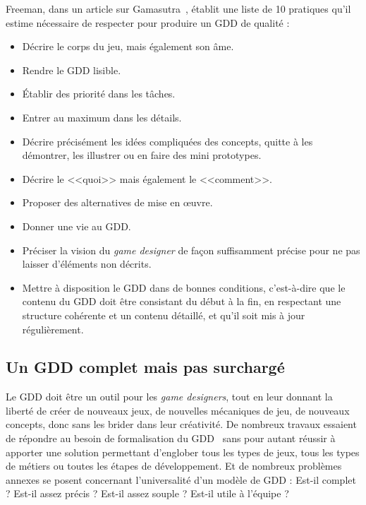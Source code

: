 Freeman, dans un article sur Gamasutra~\cite{gama_greateGDD}, établit une liste de 10 pratiques qu'il estime nécessaire de respecter pour produire un GDD de qualité :
\begin{itemize}
    \item Décrire le corps du jeu, mais également son âme.
    \item Rendre le GDD lisible.
    \item Établir des priorité dans les tâches.
    \item Entrer au maximum dans les détails.
    \item Décrire précisément les idées compliquées des concepts, quitte à les démontrer, les illustrer ou en faire des mini prototypes.
    \item Décrire le <<quoi>> mais également le <<comment>>.
    \item Proposer des alternatives de mise en \oe{}uvre.
    \item Donner une vie au GDD.
    \item Pr\'eciser la vision du \emph{game designer} de fa\c{c}on suffisamment précise pour ne pas laisser d'éléments non décrits.
    \item Mettre à disposition le GDD dans de bonnes conditions, c'est-à-dire que le contenu du GDD doit être consistant du début à la fin, en respectant une structure cohérente et un contenu détaillé, et qu'il soit mis à jour régulièrement.
\end{itemize}

\subsection{Un GDD complet mais pas surchargé}


Le GDD doit \^etre un outil pour les \emph{game designers}, tout en leur donnant la liberté de créer de nouveaux jeux, de nouvelles mécaniques de jeu, de nouveaux concepts, donc sans les brider dans leur cr\'eativit\'e.
De nombreux travaux essaient de répondre au besoin de formalisation du GDD~\cite{multiview,gama_greateGDD,GDD_GDProject,GDD_software} sans pour autant réussir à apporter une solution permettant d'englober tous les types de jeux, tous les types de métiers ou toutes les étapes de développement.
Et de nombreux problèmes annexes se posent concernant l'universalité d'un modèle de GDD : Est-il complet ? Est-il assez précis ? Est-il assez souple ? Est-il utile à l'équipe ? 

